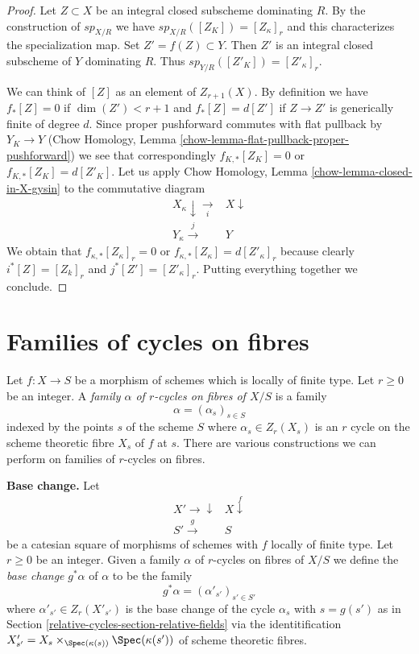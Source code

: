 \begin{proof}
Let $Z \subset X$ be an integral closed subscheme dominating $R$.
By the construction of $sp_{X/R}$ we have $sp_{X/R}([Z_K]) = [Z_\kappa]_r$
and this characterizes the specialization map.
Set $Z' = f(Z) \subset Y$. Then $Z'$ is an integral closed subscheme
of $Y$ dominating $R$. Thus $sp_{Y/R}([Z'_K]) = [Z'_\kappa]_r$.

\medskip\noindent
We can think of $[Z]$ as an element of $Z_{r + 1}(X)$. By definition
we have $f_*[Z] = 0$ if $\dim(Z') < r + 1$ and $f_*[Z] = d[Z']$
if $Z \to Z'$ is generically finite of degree $d$.
Since proper pushforward commutes with flat pullback by $Y_K \to Y$
(Chow Homology, Lemma \ref{chow-lemma-flat-pullback-proper-pushforward})
we see that correspondingly $f_{K, *}[Z_K] = 0$ or $f_{K, *}[Z_K] = d[Z'_K]$.
Let us apply Chow Homology, Lemma \ref{chow-lemma-closed-in-X-gysin} to
the commutative diagram
$$
\begin{array}{cc}X_\kappa \downarrow\underset{i}{\longrightarrow} & X \downarrow \\ Y_\kappa \overset{j}{\longrightarrow} & Y\end{array}
$$
We obtain that $f_{\kappa, *}[Z_\kappa]_r = 0$ or
$f_{\kappa, *}[Z_\kappa] = d[Z'_\kappa]_r$ because
clearly $i^*[Z] = [Z_k]_r$ and $j^*[Z'] = [Z'_\kappa]_r$.
Putting everything together we conclude.
\end{proof}

\section{Families of cycles on fibres}
\label{relative-cycles-section-cycles-fibres}
Let $f : X \to S$ be a morphism of schemes which is locally of finite type.
Let $r \geq 0$ be an integer. A
{\it family $\alpha$ of $r$-cycles on fibres of $X/S$} is a family
$$
\alpha = (\alpha_s)_{s \in S}
$$
indexed by the points $s$ of the scheme $S$ where $\alpha_s \in Z_r(X_s)$
is an $r$ cycle on the scheme theoretic fibre $X_s$ of $f$ at $s$.
There are various constructions we can perform on families of
$r$-cycles on fibres.

\medskip\noindent
{\bf Base change.} Let
$$
\begin{array}{cc}X' \longrightarrow\downarrow & X \overset{f}{\downarrow} \\ S' \overset{g}{\longrightarrow} & S\end{array}
$$
be a catesian square of morphisms of schemes with $f$ locally of finite type.
Let $r \geq 0$ be an integer. Given a family $\alpha$ of $r$-cycles on
fibres of $X/S$ we define the {\it base change} $g^*\alpha$ of $\alpha$
to be the family
$$
g^*\alpha = (\alpha'_{s'})_{s' \in S'}
$$
where $\alpha'_{s'} \in Z_r(X'_{s'})$ is the base change
of the cycle $\alpha_s$ with $s = g(s')$ as in
Section \ref{relative-cycles-section-relative-fields} via the identitification
$X'_{s'} = X_s \times_{\Spec(\kappa(s))} \Spec(\kappa(s'))$
of scheme theoretic fibres.

